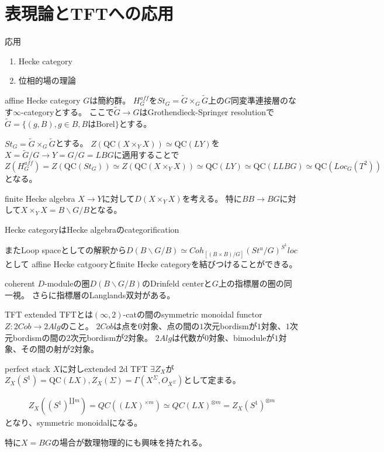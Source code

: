\documentclass[dvipdfmx]{beamer}
\newcommand{\QC}{\mathrm{QC}}
\begin{document}
\section{表現論とTFTへの応用}
\begin{frame}{応用}
\begin{enumerate}
\item Hecke category
\item 位相的場の理論
\end{enumerate}
\end{frame}

\begin{frame}{affine Hecke category}
$G$は簡約群。
$H^{aff}_G$を$St_G=\tilde{G}\times_G\tilde{G}$上の$G$同変準連接層のなす$\infty$-categoryとする。
ここで$\tilde{G} \to G$はGrothendieck-Springer resolutionで$\tilde{G}=\{(g,B), g\in B, B\text{はBorel}\}$とする。

$St_G=\tilde{G}\times_G\tilde{G}$とする。
$Z(\QC(X\times_YX)) \simeq \QC(LY)$を$X=\tilde{G}/G \to Y=G/G=LBG$に適用することで
$Z(H^{aff}_G)=Z(\QC(St_G))\simeq Z(\QC(X\times_YX))\simeq \QC(LY)\simeq \QC(LLBG)\simeq \QC(Loc_G(T^2))$となる。
\end{frame}

\begin{frame}{finite Hecke algebra}
$X \to Y$に対して$D(X\times_YX)$を考える。
特に$BB \to BG$に対して$X\times_YX=B\backslash G/B$となる。

Hecke categoryはHecke algebraのcategorification

またLoop spaceとしての解釈から$D(B\backslash G/B)\simeq Coh_{[(B\times B)/G]}(St^u/G)^{S^1}{loc}$として
affine Hecke catgooryとfinite Hecke categoryを結びつけることができる。

coherent $D$-moduleの圏$D(B\backslash G/B)$のDrinfeld centerと$G$上の指標層の圏の同一視。
さらに指標層のLanglands双対がある。
\end{frame}

\begin{frame}{TFT}
extended TFTとは$(\infty,2)$-catの間のsymmetric monoidal functor $Z:2Cob \to 2Alg$のこと。
$2Cob$は点を$0$対象、点の間の$1$次元bordismが$1$対象、$1$次元bordismの間の$2$次元bordismが$2$対象。
$2Alg$は代数が$0$対象、bimoduleが$1$対象、その間の射が$2$対象。

\begin{prop}
perfect stack $X$に対しextended 2d TFT $\exists Z_X$が
$Z_X(S^1)=\QC(LX), Z_X(\Sigma)=\Gamma(X^\Sigma, O_{X^\Sigma})$として定まる。
\end{prop}

\begin{align*}
Z_X((S^1)^{\amalg m})=QC((LX)^{\times m})\simeq QC(LX)^{\otimes m} = Z_X(S^1)^{\otimes m}
\end{align*}
となり、symmetric monoidalになる。

特に$X=BG$の場合が数理物理的にも興味を持たれる。
\end{frame}
\end{document}
